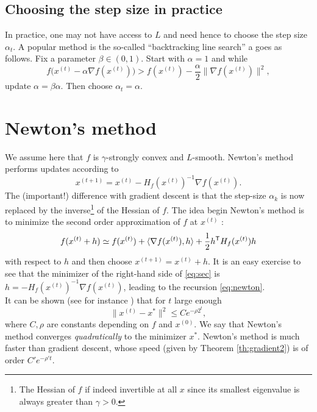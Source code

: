 \documentclass[11pt,nocut]{article}
\begin{document}
\subsection{Choosing the step size in practice}

In practice, one may not have access to $L$ and need hence to choose the step size $\alpha_t$. A popular method is the so-called ``backtracking line search'' a goes as follows.
Fix a parameter $\beta \in (0,1)$.
Start with $\alpha = 1$ and while
$$
f\big(x^{(t)} - \alpha \nabla f (x^{(t)}) \big) > f(x^{(t)}) - \frac{\alpha}{2} \|\nabla f(x^{(t)}) \|^2,
$$
update $\alpha =\beta \alpha$. Then choose $\alpha_t = \alpha$.

\section{Newton's method}

We assume here that $f$ is $\gamma$-strongly convex and $L$-smooth.
Newton's method performs updates according to
\begin{equation}\label{eq:newton}
	x^{(t+1)} = x^{(t)} - H_f(x^{(t)})^{-1} \nabla f(x^{(t)}).
\end{equation}
The (important!) difference with gradient descent is that the step-size $\alpha_k$ is now replaced by the inverse\footnote{The Hessian of $f$ if indeed invertible at all $x$ since its smallest eigenvalue is always greater than $\gamma >0$.} of the Hessian of $f$. The idea begin Newton's method is to minimize the second order approximation of $f$ at $x^{(t)}$ :
\begin{equation}\label{eq:sec}
	f(x^{(t)}+h) \simeq f(x^{(t)}) + \langle \nabla f(x^{(t)}), h \rangle + \frac{1}{2} h^{{\sf T}} H_f(x^{(t)}) h
\end{equation}
with respect to $h$ and then choose $x^{(t+1)} = x^{(t)} + h$. It is an easy exercise to see that the minimizer of the right-hand side of \eqref{eq:sec} is $h=- H_f(x^{(t)})^{-1} \nabla f(x^{(t)})$, leading to the recursion \eqref{eq:newton}.
\\

It can be shown (see for instance \cite{boyd2004convex}) that for $t$ large enough
\begin{equation}\label{eq:newton}
\|x^{(t)} - x^* \|^2 \leq C e^{-\rho 2^t},
\end{equation}
where $C,\rho$ are constants depending on $f$ and $x^{(0)}$. We say that Newton's method converges \emph{quadratically} to the minimizer $x^*$. Newton's method is much faster than gradient descent, whose speed (given by Theorem \ref{th:gradient2}) is of order $C' e^{-\rho' t}$.
\\
\end{document}
